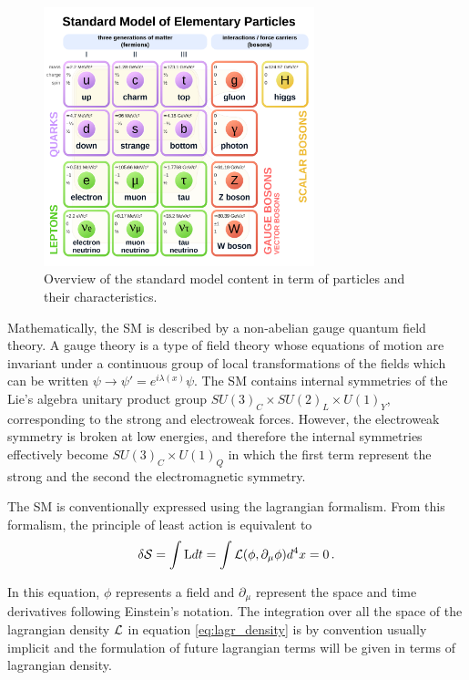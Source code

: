 \begin{figure}
    \centering
    \includegraphics[width=0.7\textwidth]{Images/SM_zoo.png}
    \caption{Overview of the standard model content in term of particles and their characteristics.}
    \label{fig:SM}
\end{figure}

Mathematically, the SM is described by a non-abelian gauge quantum field theory. A gauge theory is a type of field theory whose equations of motion are invariant under a continuous group of local transformations of the fields which can be written $\psi \rightarrow \psi' = e^{i\lambda(x)}\psi$. The SM contains internal symmetries of the Lie's algebra unitary product group $SU(3)_C \times SU(2)_L \times U(1)_Y$, corresponding to the strong and electroweak forces. However, the electroweak symmetry is broken at low energies, and therefore the internal symmetries effectively become $SU(3)_C \times U(1)_Q$ in which the first term represent the strong and the second the electromagnetic symmetry.

The SM is conventionally expressed using the lagrangian formalism. From this formalism, the principle of least action is equivalent to \cite{Thomson:2013zua}
\begin{equation}
    \delta \mathcal{S} = \int \mathrm{L} dt = \int \Lagr(\phi,\partial_{\mu}\phi) d^4 x = 0 \mend
    \label{eq:lagr_density}
\end{equation}

In this equation, $\phi$ represents a field and $\partial_{\mu}$ represent the space and time derivatives following Einstein's notation. The integration over all the space of the lagrangian density $\mathcal{L}$ in equation \ref{eq:lagr_density} is by convention usually implicit and the formulation of future lagrangian terms will be given in terms of lagrangian density.

